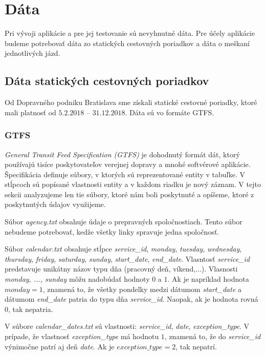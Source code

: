 \section{Dáta}
Pri vývoji aplikácie a pre jej testovanie sú nevyhnutné dáta. Pre účely aplikácie budeme potrebovať dáta zo statických cestovných poriadkov a dáta o meškaní jednotlivých jázd. 

\subsection{Dáta statických cestovných poriadkov}
Od Dopravného podniku Bratislava sme získali statické cestovné poriadky, ktoré mali platnosť od $5.2.2018$ – $31.12.2018$. Dáta sú vo formáte GTFS. 

\subsubsection{GTFS}
\label{sec:gtfs}
\textit{General Transit Feed Specification (GTFS)} je dohodnutý formát dát, ktorý používajú tisíce poskytovateľov verejnej dopravy a mnohé softvérové aplikácie. Špecifikácia definuje súbory, v ktorých sú reprezentované entity v tabuľke. V stĺpcoch sú popísané vlastnosti entity a v každom riadku je nový záznam. V tejto sekcii analyzujeme len tie súbory, ktoré nám boli poskytnuté a opíšeme, ktoré z poskytnutých údajov využijeme.

Súbor \textit{agency.txt} obsahuje údaje o prepravných spoločnostiach. Tento súbor nebudeme potrebovať, kedže všetky linky spravuje jedna spoločnosť. 

Súbor \textit{calendar.txt} obsahuje stĺpce \textit{service\_id}, \textit{monday}, \textit{tuesday}, \textit{wednesday}, \textit{thursday}, \textit{friday}, \textit{saturday}, \textit{sunday}, \textit{start\_date}, \textit{end\_date}. Vlasntosť \textit{service\_id} predstavuje unikátny názov typu dňa (pracovný deň, víkend,...). Vlasnosti \textit{monday, ..., sunday} môžu nadobúdať hodnoty $0$ a $1$. Ak je napríklad hodnota $monday = 1$, znamená to, že všetky pondelky medzi dátumom \textit{start\_date} a dátumom \textit{end\_date} patria do typu dňa \textit{service\_id}. Naopak, ak je hodnota rovná $0$, tak nepatria. 

V súbore \textit{calendar\_dates.txt} sú vlastnosti: \textit{service\_id}, \textit{date}, \textit{exception\_type}. V prípade, že vlastnosť \textit{exception\_type} má hodnotu $1$, znamená to, že do \textit{service\_id} výnimočne patrí aj deň \textit{date}. Ak je $exception\_type = 2$, tak nepatrí.


